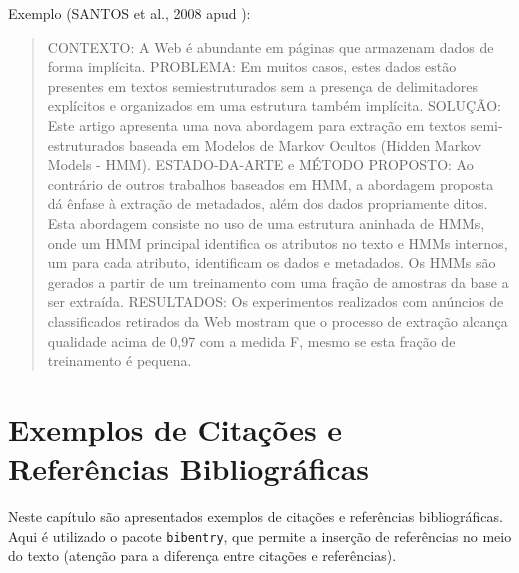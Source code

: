 \documentclass[twoside,english,brazilian]{UNISINOSmonografia}
\begin{document}
Exemplo (SANTOS et al., 2008 apud \citealp{Moro11}):
\begin{quote}
CONTEXTO: A Web é abundante em páginas que armazenam  dados de forma implícita. PROBLEMA: Em muitos casos, estes dados estão presentes em textos semiestruturados sem a presença de delimitadores explícitos e organizados em uma estrutura também implícita. SOLUÇÃO: Este artigo apresenta uma nova abordagem para extração em textos semi-estruturados baseada em Modelos de Markov Ocultos (Hidden Markov Models - HMM). ESTADO-DA-ARTE e MÉTODO PROPOSTO: Ao contrário de outros trabalhos baseados em HMM, a abordagem proposta dá ênfase à extração de metadados, além dos dados propriamente ditos. Esta abordagem consiste no uso de uma estrutura aninhada de HMMs, onde um HMM principal identifica os atributos no texto e HMMs internos, um para cada atributo, identificam os dados e metadados. Os HMMs são gerados a partir de um treinamento com uma fração de amostras da base a ser extraída. RESULTADOS: Os experimentos realizados com anúncios de classificados retirados da Web mostram que o processo de extração alcança qualidade acima de 0,97 com a medida F, mesmo se esta fração de treinamento é pequena. 
\end{quote}

\chapter{Exemplos de Citações e Referências Bibliográficas}
\nobibliography* %
Neste capítulo são apresentados exemplos de citações e referências bibliográficas.  Aqui é utilizado o pacote \texttt{bibentry}, que permite a inserção de referências no meio do texto (atenção para a diferença entre citações e referências).
\end{document}
